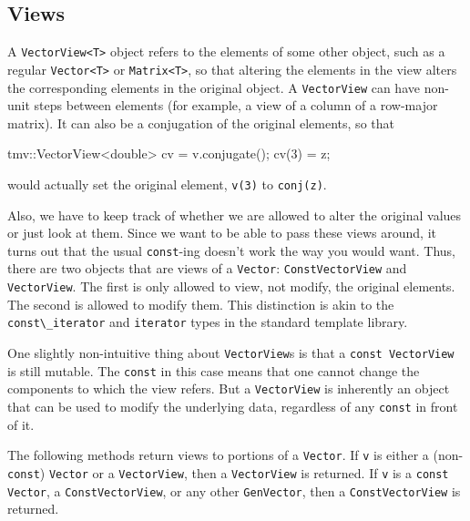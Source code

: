 \documentclass[twoside,letterpaper,11pt]{article}
\renewcommand{\tt}[1]{{\lstinline {#1}}}
\begin{document}
\subsection{Views}
\label{VViews}

A \tt{VectorView<T>} object refers to the elements of some other object, such as a regular
\tt{Vector<T>} or \tt{Matrix<T>},
so that altering the elements in the view alters the
corresponding elements in the original object.  A \tt{VectorView}
can have non-unit
steps between elements (for example, a view of a column of a row-major
matrix).  It can also be a conjugation of the original
elements, so that
\begin{tmvcode}
tmv::VectorView<double> cv = v.conjugate();
cv(3) = z;
\end{tmvcode}
would actually set the original element, \tt{v(3)} to \tt{conj(z)}. 

Also, we have to 
keep track of whether we are allowed to alter the original values or
just look at them.  
Since we want to be able to pass these views around, it turns out that
the usual \tt{const}-ing doesn't work the way you would want.
Thus, there are two objects that are views of a
\tt{Vector}:
\tt{ConstVectorView} and \tt{VectorView}.  
The first is only allowed to view,
not modify, the original elements.  The second is allowed to modify them.
This distinction is akin to the \tt{const\_iterator} and \tt{iterator} types in the
standard template library.

One slightly non-intuitive thing about \tt{VectorView}s is that a 
\tt{const VectorView} is still mutable.  The \tt{const} in this case
means that one cannot change the components to which the view refers.
But a \tt{VectorView} is inherently an object that can be used to 
modify the underlying data, regardless of any \tt{const} in front of it.

The following methods return views to portions of a \tt{Vector}.
If \tt{v} is either a (non-\tt{const}) \tt{Vector}
or a \tt{VectorView}, then a \tt{VectorView} is returned.
If \tt{v} is a \tt{const Vector}, a \tt{ConstVectorView}, or any other \tt{GenVector},
then a \tt{ConstVectorView} is returned.  
\end{document}
